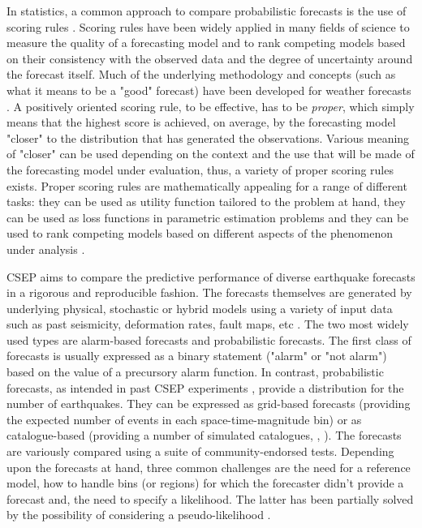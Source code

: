 \documentclass[referee,sn-basic]{sn-jnl}
\theoremstyle{thmstyleone}%
\theoremstyle{thmstyletwo}%
\theoremstyle{thmstylethree}%
\begin{document}
In statistics, a common approach to compare probabilistic forecasts is the use of scoring rules \citep{gneiting2007strictly}. Scoring rules have been widely applied in many fields of science to measure the quality of a forecasting model and to rank competing models based on their consistency with the observed data and the degree of uncertainty around the forecast itself. Much of the underlying methodology and concepts (such as what it means to be a "good" forecast) have been developed for weather forecasts \citep{murphy1993good,jolliffe2003forecast}. A positively oriented scoring rule, to be effective, has to be \emph{proper}, which simply means that the highest score is achieved, on average, by the forecasting model "closer" to the distribution that has generated the observations. Various meaning of "closer" can be used depending on the context and the use that will be made of the forecasting model under evaluation, thus, a variety of proper scoring rules exists. Proper scoring rules are mathematically appealing for a range of different tasks: they can be used as utility function tailored to the problem at hand, they can be used as loss functions in parametric estimation problems and they can be used to rank competing models based on different aspects of the phenomenon under analysis \citep{rosen1996good,hyvarinen2005estimation,hernandez2012unified}.

CSEP aims to compare the predictive performance of diverse earthquake forecasts in a rigorous and reproducible fashion. The forecasts themselves are generated by underlying physical, stochastic or hybrid models using a variety of input data such as past seismicity, deformation rates, fault maps, etc \citep{field2014uniform, steacy2014new, bayliss2020data}. The two most widely used types are alarm-based forecasts and probabilistic forecasts. The first class of forecasts is usually expressed as a binary statement ("alarm" or "not alarm") based on the value of a precursory alarm function. In contrast, probabilistic forecasts, as intended in past CSEP experiments \citep{schor2007relm}, provide a distribution for the number of earthquakes. They can be expressed as grid-based forecasts (providing the expected number of events in each space-time-magnitude bin) or as catalogue-based (providing a number of simulated catalogues, \citeauthor{savran2020pseudoprospective},\citeyear{savran2020pseudoprospective} ). The forecasts are variously compared using a suite of community-endorsed tests. Depending upon the forecasts at hand, three common challenges are the need for a reference model, how to handle bins (or regions) for which the forecaster didn't provide a forecast and, the need to specify a likelihood. The latter has been partially solved by the possibility of considering a pseudo-likelihood \citep{savran2020pseudoprospective}.
\end{document}
